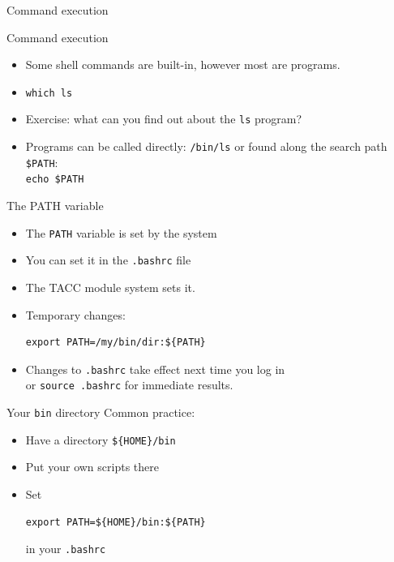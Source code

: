 \documentclass[11pt,headernav]{beamer}
\begin{document}
 {Command execution}

\begin{numberedframe}{Command execution}
  \label{sl-lnx:execute}
  \begin{itemize}
  \item Some shell commands are built-in, however most are programs.
  \item \lstinline{which ls}
  \item Exercise: what can you find out about the \lstinline{ls} program?
  \item Programs can be called directly: \lstinline{/bin/ls}
    or found along the search path \lstinline{$PATH}:\\
    \lstinline{echo $PATH}
  \end{itemize}
\end{numberedframe}

\begin{numberedframe}{The PATH variable}
  \begin{itemize}
  \item The \lstinline{PATH} variable is set by the system
  \item You can set it in the \lstinline{.bashrc} file
  \item The TACC module system sets it.
  \item Temporary changes:
\begin{lstlisting}
export PATH=/my/bin/dir:${PATH}
\end{lstlisting}
\item Changes to \lstinline{.bashrc} take effect next time you log in\\
  or \lstinline{source .bashrc} for immediate results.
  \end{itemize}
\end{numberedframe}

\begin{numberedframe}{Your \texttt{bin} directory}
  Common practice:
  \begin{itemize}
  \item Have a directory \lstinline+${HOME}/bin+
  \item Put your own scripts there
  \item Set
\begin{lstlisting}
export PATH=${HOME}/bin:${PATH}
\end{lstlisting}
        in your \lstinline{.bashrc}
  \end{itemize}
\end{numberedframe}
\end{document}
